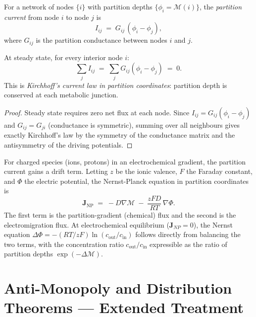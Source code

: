 \begin{definition}
\label{def:ch02-partition-current}
For a network of nodes $\{i\}$ with partition depths $\{\phi_i =
\mathcal{M}(i)\}$, the \emph{partition current} from node $i$ to node $j$ is
\[
  I_{ij} \;=\; G_{ij}\,(\phi_i - \phi_j),
\]
where $G_{ij}$ is the partition conductance between nodes $i$ and $j$.
\end{definition}

\begin{theorem}
\label{thm:ch02-kirchhoff}
At steady state, for every interior node $i$:
\[
  \sum_j I_{ij} \;=\; \sum_j G_{ij}(\phi_i - \phi_j) \;=\; 0.
\]
This is \emph{Kirchhoff's current law in partition coordinates}: partition depth
is conserved at each metabolic junction.
\end{theorem}

\begin{proof}
Steady state requires zero net flux at each node.  Since $I_{ij} = G_{ij}
(\phi_i - \phi_j)$ and $G_{ij} = G_{ji}$ (conductance is symmetric), summing
over all neighbours gives exactly Kirchhoff's law by the symmetry of the
conductance matrix and the antisymmetry of the driving potentials.
\end{proof}

\begin{remark}
\label{rem:ch02-nernst-planck}
For charged species (ions, protons) in an electrochemical gradient, the
partition current gains a drift term.  Letting $z$ be the ionic valence,
$F$ the Faraday constant, and $\Phi$ the electric potential, the
Nernst-Planck equation in partition coordinates is
\[
  \mathbf{J}_{\mathrm{NP}}
  \;=\;
  -D\nabla\mathcal{M}
  \;-\;
  \frac{zFD}{RT}\,\nabla\Phi.
\]
The first term is the partition-gradient (chemical) flux and the second is
the electromigration flux.  At electrochemical equilibrium ($\mathbf{J}_{NP} =
0$), the Nernst equation $\Delta\Phi = -(RT/zF)\ln(c_\mathrm{out}/c_\mathrm{in})$
follows directly from balancing the two terms, with the concentration ratio
$c_\mathrm{out}/c_\mathrm{in}$ expressible as the ratio of partition depths
$\exp(-\Delta\mathcal{M})$.
\end{remark}

\section{Anti-Monopoly and Distribution Theorems --- Extended Treatment}
\label{sec:ch02-anti-monopoly}

